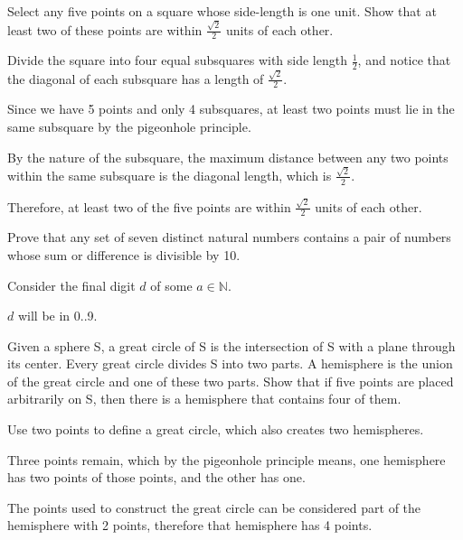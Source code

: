 \documentclass[openany, 12pt]{book}
\begin{document}
\begin{exercise}{}{}
	Select any five points on a square whose side-length is one
	unit. Show that at least two of these points are within $\frac{\sqrt{2}}{2}$
	units of each other.

	\begin{alist}
		\item Divide the square into four equal subsquares with side length
		$\frac{1}{2}$, and notice that the diagonal of each subsquare has a length
		of $\frac{\sqrt{2}}{2}$.
		\item Since we have 5 points and only 4 subsquares, at least two points must lie
		in the same subsquare by the pigeonhole principle.
		\item By the nature of the subsquare, the maximum distance between any two
		points within the same subsquare is the diagonal length, which is
		$\frac{\sqrt{2}}{2}$.
		\item Therefore, at least two of the five points are within $\frac{\sqrt{2}}{2}$
		units of each other.
	\end{alist}
\end{exercise}

\begin{exercise}{}{}
	Prove that any set of seven distinct natural numbers
	contains a pair of numbers whose sum or difference is divisible by 10.

	\begin{alist}
		\item Consider the final digit $d$ of some $a \in \mathbb{N}$.
		\item $d$ will be in 0..9.
	\end{alist}
\end{exercise}

\begin{exercise}{}{}
	Given a sphere S, a great circle of S is the intersection
	of S with a plane through its center. Every great circle divides S into two
	parts. A hemisphere is the union of the great circle and one of these two parts.
	Show that if five points are placed arbitrarily on S, then there is a hemisphere
	that contains four of them.
	\begin{alist}
		\item Use two points to define a great circle, which also creates two
		hemispheres.
		\item Three points remain, which by the pigeonhole principle means, one
		hemisphere has two points of those points, and the other has one.
		\item The points used to construct the great circle can be considered part of
		the hemisphere with 2 points, therefore that hemisphere has 4 points.
	\end{alist}
\end{exercise}
\end{document}
